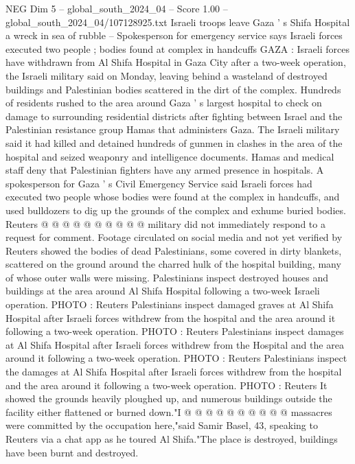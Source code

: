 \begin{textsample}{NEG Dim 5 – global\_south\_2024\_04 – Score 1.00 – global\_south\_2024\_04/107128925.txt}  \label{ex:f5_neg_116}
Israeli troops leave Gaza ' s Shifa Hospital a wreck in sea of rubble -- Spokesperson for emergency service says Israeli forces executed two people ; bodies found at complex in handcuffs GAZA : Israeli forces have withdrawn from Al Shifa Hospital in Gaza City after a two-week operation, the Israeli military said on Monday, leaving behind a wasteland of destroyed buildings and Palestinian bodies scattered in the dirt of the complex.
Hundreds of residents rushed to the area around Gaza ' s largest hospital to check on damage to surrounding residential districts after fighting between Israel and the Palestinian resistance group Hamas that administers Gaza.
The Israeli military said it had killed and detained hundreds of gunmen in clashes in the area of the hospital and seized weaponry and intelligence documents.
Hamas and medical staff deny that Palestinian fighters have any armed presence in hospitals.
A spokesperson for Gaza ' s Civil Emergency Service said Israeli forces had executed two people whose bodies were found at the complex in handcuffs, and used bulldozers to dig up the grounds of the complex and exhume buried bodies.
Reuters @ @ @ @ @ @ @ @ @ @ military did not immediately respond to a request for comment.
Footage circulated on social media and not yet verified by Reuters showed the bodies of dead Palestinians, some covered in dirty blankets, scattered on the ground around the charred hulk of the hospital building, many of whose outer walls were missing.
Palestinians inspect destroyed houses and buildings at the area around Al Shifa Hospital following a two-week Israeli operation.
PHOTO : Reuters Palestinians inspect damaged graves at Al Shifa Hospital after Israeli forces withdrew from the hospital and the area around it following a two-week operation.
PHOTO : Reuters Palestinians inspect damages at Al Shifa Hospital after Israeli forces withdrew from the Hospital and the area around it following a two-week operation.
PHOTO : Reuters Palestinians inspect the damages at Al Shifa Hospital after Israeli forces withdrew from the hospital and the area around it following a two-week operation.
PHOTO : Reuters It showed the grounds heavily ploughed up, and numerous buildings outside the facility either flattened or burned down."I @ @ @ @ @ @ @ @ @ @ massacres were committed by the occupation here,"said Samir Basel, 43, speaking to Reuters via a chat app as he toured Al Shifa."The place is destroyed, buildings have been burnt and destroyed.

\end{textsample}
